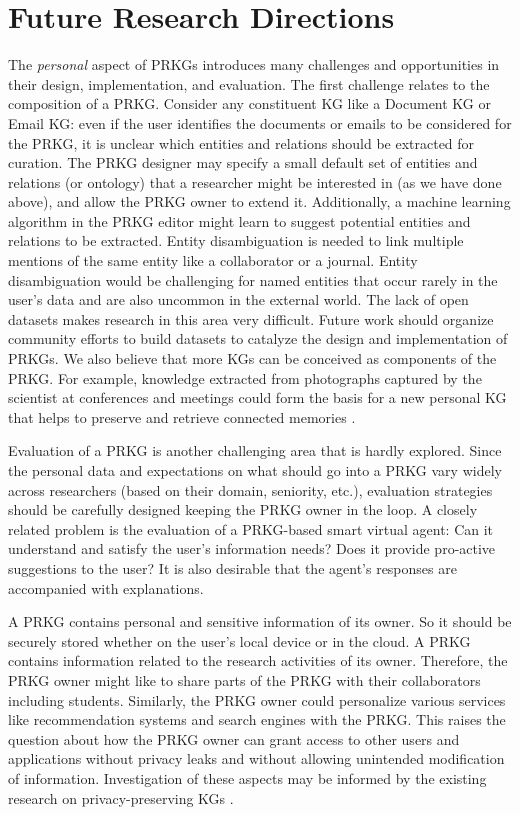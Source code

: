 \documentclass[11pt,pdftex]{article}
\begin{document}
\section{Future Research Directions} \label{prantika_sec:future}
The \textit{personal} aspect of PRKGs introduces many challenges and opportunities in their  design, implementation, and evaluation. 
The first challenge relates to the composition of a PRKG. Consider any constituent KG like a Document KG or Email KG: even if the user identifies the documents or emails to be considered for the PRKG, it is unclear which entities and relations should be extracted for curation. The PRKG designer may specify a small default set of entities and relations (or ontology) that a researcher might be interested in (as we have done above), and allow the PRKG owner to extend it. Additionally, a machine learning algorithm in the PRKG editor might learn to suggest potential entities and relations to be extracted. Entity disambiguation is needed to link multiple mentions of the same entity like a collaborator or a journal. Entity disambiguation would be challenging for named entities that occur rarely in the user's data and are also uncommon in the external world. The lack of open datasets makes research in this area very difficult. Future work should organize community efforts to build datasets to catalyze the design and implementation of PRKGs. We also believe that more KGs can be conceived as components of the PRKG. For example, knowledge extracted from photographs captured by the scientist at conferences and meetings could form the basis for a new personal KG that helps to preserve and retrieve connected memories \cite{kottur2022navigating}.

Evaluation of a PRKG is another challenging area that is hardly explored. Since the personal data and expectations on what should go into a PRKG vary widely across researchers (based on their domain, seniority, etc.), evaluation strategies should be carefully designed keeping the PRKG owner in the loop. A closely related problem is the evaluation of a PRKG-based smart virtual agent: Can it understand and satisfy the user's information needs? Does it provide pro-active suggestions to the user? It is also desirable that the agent's responses are accompanied with explanations.  

A PRKG contains personal and sensitive information of its owner. So it should be securely stored whether on the user's local device or in the cloud. 
A PRKG contains information related to the research activities of its owner. Therefore, the PRKG owner might like to share parts of the PRKG with their collaborators including students.  
Similarly, the PRKG owner could personalize various services like recommendation systems and search engines with the PRKG. This raises the question about how the PRKG owner can grant access to other users and applications without privacy leaks and without allowing unintended modification of information. Investigation of these aspects may be informed by the existing research on privacy-preserving KGs \cite{chen2020survey,purificato2021dynamic}.
\end{document}
